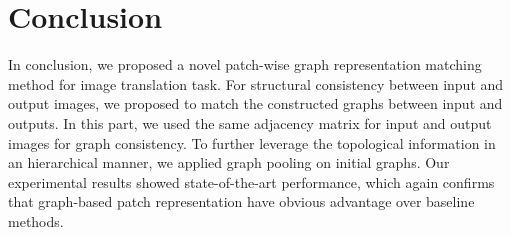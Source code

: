 \documentclass[letterpaper]{article} %
\begin{document}
\begin{table}[!t]
\begin{center}
\end{center}
\caption{Quantitative results of ablation studies. Our setting shows the best performance in both of FID and KID$\times$100.}
\label{table:ablation}
\end{table}



\vspace{-3.13mm}
\section{Conclusion}
In conclusion, we proposed a novel patch-wise graph representation matching method for image translation task. For structural consistency between input and output images, we proposed to match the constructed graphs between input and outputs. In this part, we used the same adjacency matrix for input and output images for graph consistency. To further leverage the topological information in an hierarchical manner, we applied graph pooling on initial graphs. Our experimental results showed state-of-the-art performance, which again confirms that graph-based patch representation have obvious advantage over baseline methods.
\end{document}
